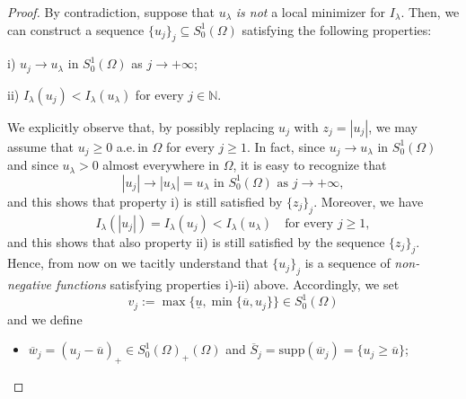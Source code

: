 \documentclass[11pt]{amsart}
\numberwithin{equation}{section} %
\theoremstyle{definition}
\begin{document}
\begin{proof}
	By contradiction, suppose
	that $u_\lambda$ \emph{is not} a local minimizer for $I_{\lambda}$. Then,
	we can construct a sequence $\{u_j\}_j\subseteq S^{1}_{0}(\Omega)$
	satisfying the following properties:
	\vspace*{0.1cm}
	
	i)\,\,$u_j\to u_\lambda$ in $S^{1}_{0}(\Omega)$ as $j\to+\infty$;
	\vspace*{0.05cm}
	
	ii)\,\,$I_{\lambda}(u_j) < I_{\lambda}(u_\lambda)$ for every $j\in\mathbb{N}$.
	\vspace*{0.1cm}
	
	\noindent We explicitly observe that, by possibly replacing $u_j$ with $z_j = |u_j|$, we may assume that
	$u_j\geq 0$ a.e.\,in $\Omega$ for every $j\geq 1$. 
	In fact, since $u_j\to u_\lambda$ in $S^{1}_{0}(\Omega)$
	and since $u_\lambda > 0$ almost everywhere in $\Omega$, it is easy to recognize that
	$$\text{$|u_j|\to |u_\lambda| = u_\lambda$ in $S^{1}_{0}(\Omega)$ as $j\to+\infty$},$$
	and this shows that property i) is still satisfied by $\{z_j\}_j$. Moreover, we have
	$$I_{\lambda}(|u_j|) = I_{\lambda}(u_j) < I_{\lambda}(u_\lambda)\quad\text{for every $j\geq 1$},$$
	and this shows that also property ii) is still satisfied by the sequence $\{z_j\}_j$.
	Hence, from now on we tacitly understand that $\{u_j\}_j$ is a sequence of \emph{non-negative functions}
	satisfying properties i)-ii) above.
	Accordingly, we set 
	$$v_j := 
	\max\{\underline{u},\min\{\overline{u},u_j\}\}\in S^{1}_{0}(\Omega)$$ 
	and we define
	\begin{itemize}
		\item[$(\ast)$] $\overline{w}_j = (u_j-\overline{u})_+\in S^{1}_{0}(\Omega)_+(\Omega)$ 
		and $\overline{S}_j = \mathrm{supp}(\overline{w}_j)
		= \{u_j\geq \overline{u}\}$;
		\vspace*{0.1cm}
		

\end{itemize}
\end{proof}
\end{document}
